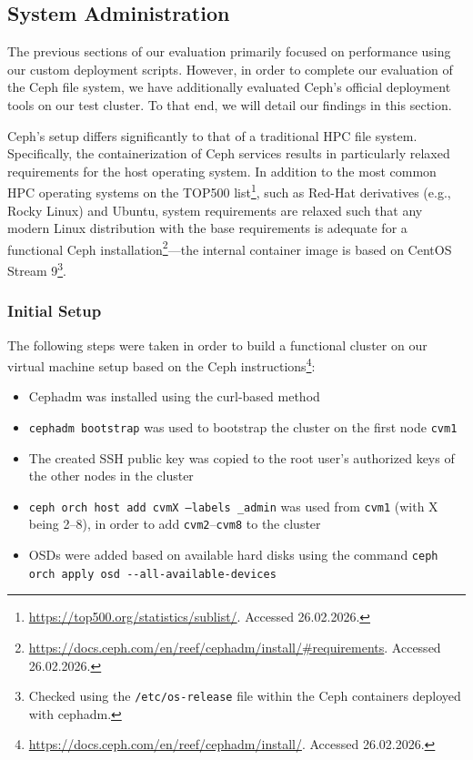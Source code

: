 \pagebreak
\subsection{System Administration}
\label{sec:system-admin}

The previous sections of our evaluation primarily focused on performance using our custom deployment scripts. However, in order to complete our evaluation of the Ceph file system, we have additionally evaluated Ceph's official deployment tools on our test cluster. To that end, we will detail our findings in this section.

Ceph's setup differs significantly to that of a traditional \ac{HPC} file system. Specifically, the containerization of Ceph services results in particularly relaxed requirements for the host operating system. In addition to the most common \ac{HPC} operating systems on the TOP500 list\footnote{\url{https://top500.org/statistics/sublist/}. Accessed 26.02.2026.}, such as Red-Hat derivatives (e.g., Rocky Linux) and Ubuntu, system requirements are relaxed such that any modern Linux distribution with the base requirements is adequate for a functional Ceph installation\footnote{\url{https://docs.ceph.com/en/reef/cephadm/install/\#requirements}. Accessed 26.02.2026.}---the internal container image is based on CentOS Stream 9\footnote{Checked using the \texttt{/etc/os-release} file within the Ceph containers deployed with cephadm.}.

\subsubsection{Initial Setup}

The following steps were taken in order to build a functional cluster on our virtual machine setup based on the Ceph instructions\footnote{\url{https://docs.ceph.com/en/reef/cephadm/install/}. Accessed 26.02.2026.}:

\begin{sloppypar}
\begin{itemize}
    \item Cephadm was installed using the curl-based method
    \item \texttt{cephadm bootstrap} was used to bootstrap the cluster on the first node \texttt{cvm1}
    \item The created \ac{SSH} public key was copied to the root user's authorized keys of the other nodes in the cluster
    \item \texttt{ceph orch host add cvmX --labels \_admin} was used from \texttt{cvm1} (with X being 2--8), in order to add \texttt{cvm2}--\texttt{cvm8} to the cluster
    \item \acp{OSD} were added based on available hard disks using the command \texttt{ceph orch apply osd -{}-all-available-devices}
\end{itemize}
\end{sloppypar}

